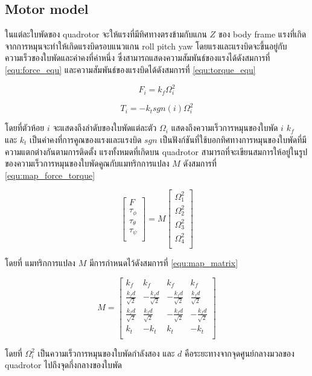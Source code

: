 \clearpage
\subsection{Motor model}
ในแต่ละใบพัดของ quadrotor จะให้แรงที่มีทิศทางตรงข้ามกับแกน $Z$ ของ body frame
แรงที่เกิดจากการหมุนจะทำให้เกิดแรงบิดรอบแนวแกน roll pitch yaw โดยแรงและแรงบิดจะขึ้นอยู่กับความเร็วของใบพัดและค่าคงที่ค่าหนึ่ง
ซึ่งสามารถแสดงความสัมพันธ์ของแรงได้ดังสมการที่ \ref{equ:force_equ} และความสัมพันธ์ของแรงบิดได้ดังสมการที่ \ref{equ:torque_equ}

\begin{equation}
    {F_i = k_f\Omega_i^2}
	\label{equ:force_equ}
\end{equation}

\begin{equation}
    {T_i = -k_tsgn(i)\Omega_i^2}
	\label{equ:torque_equ}
\end{equation}

โดยที่ตัวห้อย $i$ จะแสดงถึงลำดับของใบพัดแต่ละตัว $\Omega_i$ แสดงถึงความเร็วการหมุนของใบพัด $i$
$k_f$ และ $k_t$ เป็นค่าคงที่การคูณของแรงและแรงบิด $sgn$ เป็นฟังก์ชันที่ใช้บอกทิศทางการหมุนของใบพัดที่มีความแตกต่างกันตามการติดตั้ง
แรงทั้งหมดที่เกิดบน quadrotor สามารถที่จะเขียนสมการให้อยู่ในรูปของความเร็วการหมุนของใบพัดคูณกับแมทริกการแปลง $M$ ดังสมการที่ \ref{equ:map_force_torque}

\begin{equation}
    {\begin{bmatrix} 
    F \\[10pt] \tau_\phi \\[10pt] \tau_\theta \\[10pt] \tau_\psi \\
    \end{bmatrix} = M\begin{bmatrix}
    \Omega_1^2 \\[10pt]
    \Omega_2^2 \\[10pt]
    \Omega_3^2 \\[10pt]
    \Omega_4^2 \\       
    \end{bmatrix}}
	\label{equ:map_force_torque}
\end{equation}

โดยที่ แมทริกการแปลง $M$ มีการกำหนดไว้ดังสมการที่ \ref{equ:map_matrix}

\begin{equation}
    {M = \begin{bmatrix}
    k_f & k_f & k_f & k_f \\[10pt]
    \frac{k_fd}{\sqrt{2}} & -\frac{k_fd}{\sqrt{2}} & -\frac{k_fd}{\sqrt{2}} & \frac{k_fd}{\sqrt{2}}  \\[10pt]
    \frac{k_fd}{\sqrt{2}} & \frac{k_fd}{\sqrt{2}} & -\frac{k_fd}{\sqrt{2}} & -\frac{k_fd}{\sqrt{2}}  \\[10pt]
    k_t & -k_t & k_t & -k_t \\
    \end{bmatrix}}
	\label{equ:map_matrix}
\end{equation}

โดยที่ $\Omega_i^2$ เป็นความเร็วการหมุนของใบพัดกำลังสอง และ $d$ คือระยะทางจากจุดศูนย์กลางมวลของ quadrotor ไปถึงจุดกึ่งกลางของใบพัด


